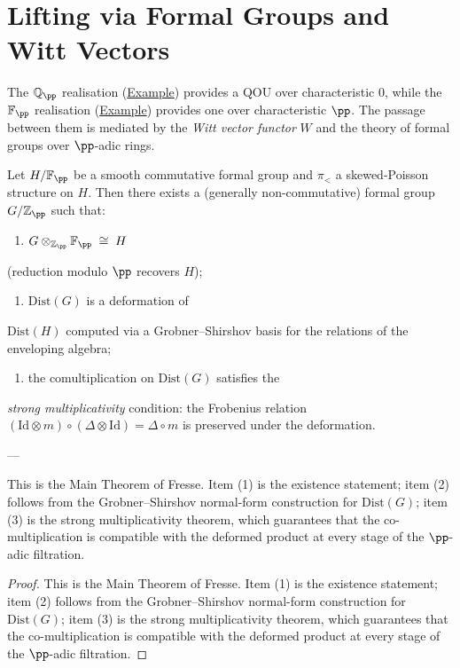 \section{Lifting via Formal Groups and Witt Vectors}
\label{sec:witt-vector-lifting}

The $\mathbb{Q}_\pp$ realisation (\hyperref[ex:p-adic-realisation]{Example}) provides
a QOU over characteristic $0$, while the $\mathbb{F}_\pp$ realisation
(\hyperref[ex:finite-field-realisation]{Example}) provides one over
characteristic $\pp$.  The passage between them is mediated by the
\emph{Witt vector functor} $W$ and the theory of formal groups
over $\pp$-adic rings.

\begin{proposition}
  \label{prop:skew-poisson-integration}
Let $H/\mathbb{F}_\pp$ be a smooth commutative formal group and
$\pi_<$ a skewed-Poisson structure on $H$.  Then there exists a
(generally non-commutative) formal group $G/\mathbb{Z}_\pp$ such that:

\begin{enumerate}
  \item $G \otimes_{\mathbb{Z}_\pp} \mathbb{F}_\pp \;\cong\; H$
\end{enumerate}
   (reduction modulo $\pp$ recovers $H$);

\begin{enumerate}
  \item $\mathrm{Dist}(G)$ is a deformation of
\end{enumerate}
   $\mathrm{Dist}(H)$ computed via a
   Grobner--Shirshov basis for the relations of the enveloping
   algebra;

\begin{enumerate}
  \item the comultiplication on $\mathrm{Dist}(G)$ satisfies the
\end{enumerate}
   \emph{strong multiplicativity} condition: the Frobenius relation
   $(\mathrm{Id}\otimes m)\circ(\Delta\otimes\mathrm{Id})
   = \Delta\circ m$ is preserved under the deformation.

---

This is the Main Theorem of Fresse.  Item (1) is the
existence statement; item (2) follows from the
Grobner--Shirshov normal-form construction for $\mathrm{Dist}(G)$;
item (3) is the strong multiplicativity theorem, which guarantees
that the co-multiplication is compatible with the deformed product at
every stage of the $\pp$-adic filtration.
\end{proposition}
\begin{proof}
This is the Main Theorem of Fresse.  Item (1) is the
existence statement; item (2) follows from the
Grobner--Shirshov normal-form construction for $\mathrm{Dist}(G)$;
item (3) is the strong multiplicativity theorem, which guarantees
that the co-multiplication is compatible with the deformed product at
every stage of the $\pp$-adic filtration.
\end{proof}

